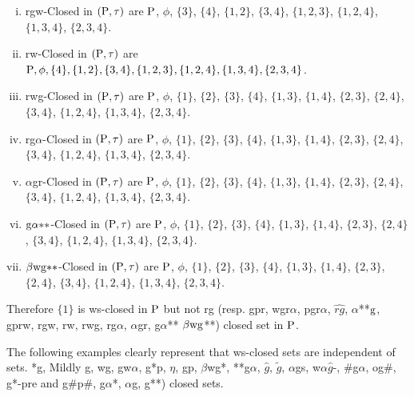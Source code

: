 \begin{exm}
\begin{enumerate}[(i)]
\item rgw-Closed in $(\mathrm{P}, \tau)$ are $\mathrm{P}$, $\phi$, $\{3\}$, $\{4\}$, $\{1, 2\}$, $\{3, 4\}$, $\{1, 2, 3\}$, $\{1, 2, 4\}$, $\{1, 3, 4\}$, $\{2, 3, 4\}$.

\item rw-Closed in $(\mathrm{P}, \tau)$ are $\mathrm{P}, \phi,\{4\},\{1, 2\},\{3, 4\},\{1, 2, 3\},\{1, 2, 4\},\{1, 3, 4\},\{2, 3, 4\}$.

\item rwg-Closed in $(\mathrm{P}, \tau)$ are $\mathrm{P}$, $ \phi$, $\{1\}$, $\{2\}$, $\{3\}$, $\{4\}$, $\{1,  3\}$, $\{1, 4\}$, $\{2, 3\}$, $\{2, 4\}$, $\{3, 4\}$, $\{1, 2, 4\}$, $\{1, 3, 4\}$, $\{2, 3, 4\}$.

\item rg$\alpha$-Closed in $(\mathrm{P}, \tau)$ are $\mathrm{P}$, $ \phi$, $\{1\}$, $\{2\}$, $\{3\}$, $\{4\}$, $\{1, 3\}$, $\{1, 4\}$, $\{2, 3\}$, $\{2, 4\}$, $\{3, 4\}$, $ \{1, 2, 4\}$, $ \{1, 3, 4\}$, $\{2, 3, 4\}$.

\item $\alpha$gr-Closed in $(\mathrm{P}, \tau)$ are $\mathrm{P}$, $ \phi$, $\{1\}$, $\{2\}$, $\{3\}$, $\{4\}$, $\{1, 3\}$, $\{1, 4\}$, $\{2, 3\}$, $\{2, 4\}$, $\{3, 4\}$, $ \{1, 2, 4\}$, $ \{1, 3, 4\}$, $\{2, 3, 4\}$.

\item $\mathrm{g}\alpha {*}{*}$-Closed in $(\mathrm{P}, \tau)$ are $\mathrm{P}$, $ \phi$, $\{1\}$, $\{2\}$, $\{3\}$, $\{4\}$, $\{1, 3\}$, $\{1, 4\}$, $\{2, 3\}$, $\{2, 4\}$, $\{3, 4\}$, $ \{1, 2, 4\}$, $ \{1, 3, 4\}$, $\{2, 3, 4\}$.

\item $\beta \mathrm{wg}{*}{*}$-Closed in $(\mathrm{P}, \tau)$ are $\mathrm{P}$, $ \phi$, $\{1\}$, $\{2\}$, $\{3\}$, $\{4\}$, $\{1, 3\}$, $\{1, 4\}$, $\{2, 3\}$, $\{2, 4\}$, $\{3, 4\}$, $ \{1, 2, 4\}$, $ \{1, 3, 4\}$, $\{2, 3, 4\}$.
\end{enumerate}
\end{exm}

Therefore $\{1\}$ is ws-closed in $\mathrm{P}$ but not rg (resp. gpr, wgr$\alpha$, pgr$\alpha$, $\widehat{rg}$, $\alpha${*}{*}$\mathrm{g}$, gprw, rgw, rw, rwg, rg$\alpha$, $\alpha$gr, g$\alpha${*}{*} $\beta \mathrm{wg}${*}{*}) closed set in $\mathrm{P}$.

\begin{rem}\label{rem2.1.2}
The following examples clearly represent that ws-closed sets are independent of sets. *g, Mildly g, wg, gw$\alpha$, g*p, $\eta$, gp, $\beta$wg*, {*}{*}g$\alpha$, $\hat{g}$, $\tilde{g}$, $\alpha$gs, w$\alpha\hat{g}$-, $\#$g$\alpha$, og$\#$, g*-pre and g\#p\#, g$\alpha$*, $\alpha$g, g{*}{*}) closed sets.
\end{rem}

